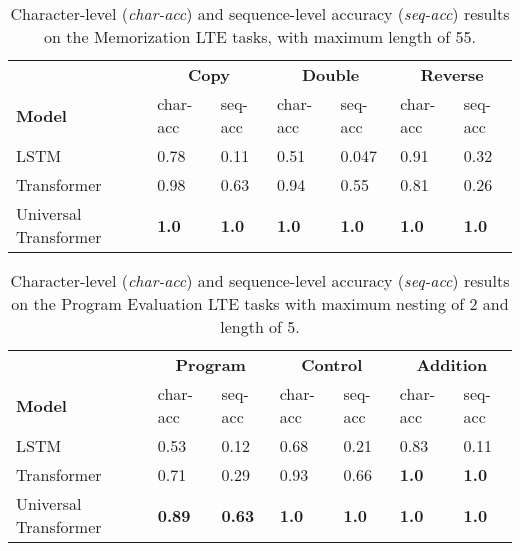 \begin{table}
    \centering
    \begin{tabular}{lllllll}
        \toprule
        & \multicolumn{2}{c}{ \bf Copy } & \multicolumn{2}{c}{ \bf Double } & \multicolumn{2}{c}{ \bf Reverse } \\
        \cmidrule(l{2pt}r{2pt}){2-3} \cmidrule(l{2pt}r{2pt}){4-5} \cmidrule(l{2pt}r{2pt}){6-7}
        \bf Model & char-acc & seq-acc & char-acc & seq-acc & char-acc & seq-acc \\ \midrule
        LSTM & 0.78 & 0.11 & 0.51 & 0.047 & 0.91 & 0.32 \\
        Transformer & 0.98 & 0.63 & 0.94 & 0.55 & 0.81 & 0.26 \\
        Universal Transformer & \textbf{1.0} & \textbf{1.0} & \textbf{1.0} & \textbf{1.0} & \textbf{1.0} & \textbf{1.0} \\ \bottomrule
    \end{tabular}
    \caption{Character-level (\emph{char-acc}) and sequence-level accuracy (\emph{seq-acc}) results on the Memorization LTE tasks, with maximum length of 55.}
    \label{tab:lte-mem}
\end{table}

\begin{table}
    \centering
    \begin{tabular}{lllllll}
    \toprule
        & \multicolumn{2}{c}{ \bf Program } & \multicolumn{2}{c}{ \bf Control } & \multicolumn{2}{c}{ \bf Addition } \\ \cmidrule(l{2pt}r{2pt}){2-3} \cmidrule(l{2pt}r{2pt}){4-5} \cmidrule(l{2pt}r{2pt}){6-7}
        \bf{Model} & char-acc & seq-acc & char-acc & seq-acc & char-acc & seq-acc \\ \midrule
        LSTM & 0.53 & 0.12 & 0.68 & 0.21 & 0.83 & 0.11 \\
        Transformer & 0.71 & 0.29 & 0.93 & 0.66 & \textbf{1.0} & \textbf{1.0} \\
        Universal Transformer & \textbf{0.89} & \textbf{0.63} & \textbf{1.0} & \textbf{1.0} & \textbf{1.0} & \textbf{1.0} \\
    \bottomrule
    \end{tabular}
    \caption{Character-level (\emph{char-acc}) and sequence-level accuracy (\emph{seq-acc}) results on the Program Evaluation LTE tasks with maximum nesting of 2 and length of 5.}
    \label{tab:lte-prog}
\end{table}